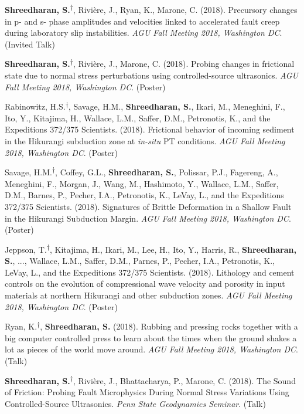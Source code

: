 \documentclass[11pt,letterpaper]{article}
\begin{document}
\begin{etaremune}
    \item {\bf Shreedharan, S.}\textsuperscript{$\dagger$}, Rivi\`ere, J., Ryan, K., Marone, C. (2018). Precursory changes in p- and s- phase amplitudes and velocities linked to accelerated fault creep during laboratory slip instabilities. {\em AGU Fall Meeting 2018, Washington DC}. (Invited Talk)
    \item {\bf Shreedharan, S.}\textsuperscript{$\dagger$}, Rivi\`ere, J., Marone, C. (2018). Probing changes in frictional state due to normal stress perturbations using controlled-source ultrasonics. {\em AGU Fall Meeting 2018, Washington DC}. (Poster)
    \item Rabinowitz, H.S.\textsuperscript{$\dagger$}, Savage, H.M., {\bf Shreedharan, S.}, Ikari, M., Meneghini, F., Ito, Y., Kitajima, H., Wallace, L.M., Saffer, D.M., Petronotis, K., and the Expeditions 372/375 Scientists. (2018). Frictional behavior of incoming sediment in the Hikurangi subduction zone at {\em in-situ} PT conditions. {\em AGU Fall Meeting 2018, Washington DC}. (Poster)
    \item Savage, H.M.\textsuperscript{$\dagger$}, Coffey, G.L., {\bf Shreedharan, S.}, Polissar, P.J., Fagereng, A., Meneghini, F., Morgan, J., Wang, M., Hashimoto, Y., Wallace, L.M., Saffer, D.M., Barnes, P., Pecher, I.A., Petronotis, K., LeVay, L., and the Expeditions 372/375 Scientists. (2018). Signatures of Brittle Deformation in a Shallow Fault in the Hikurangi Subduction Margin. {\em AGU Fall Meeting 2018, Washington DC}. (Poster)
    \item Jeppson, T.\textsuperscript{$\dagger$}, Kitajima, H., Ikari, M., Lee, H., Ito, Y., Harris, R., {\bf Shreedharan, S.}, ..., Wallace, L.M., Saffer, D.M., Parnes, P., Pecher, I.A., Petronotis, K., LeVay, L., and the Expeditions 372/375 Scientists. (2018). Lithology and cement controls on the evolution of compressional wave velocity and porosity in input materials at northern Hikurangi and other subduction zones. {\em AGU Fall Meeting 2018, Washington DC}. (Poster)
    \item Ryan, K.\textsuperscript{$\dagger$}, {\bf Shreedharan, S.} (2018). Rubbing and pressing rocks together with a big computer controlled press to learn about the times when the ground shakes a lot as pieces of the world move around. {\em AGU Fall Meeting 2018, Washington DC}. (Talk)
    \item {\bf Shreedharan, S.}\textsuperscript{$\dagger$}, Rivi\`ere, J., Bhattacharya, P., Marone, C. (2018). The Sound of Friction: Probing Fault Microphysics During Normal Stress Variations Using Controlled-Source Ultrasonics. {\em Penn State Geodynamics Seminar}. (Talk)

\end{etaremune}
\end{document}
